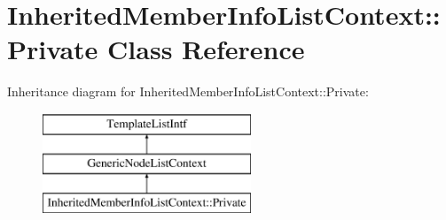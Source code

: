 \hypertarget{class_inherited_member_info_list_context_1_1_private}{}\section{Inherited\+Member\+Info\+List\+Context\+::Private Class Reference}
\label{class_inherited_member_info_list_context_1_1_private}
Inheritance diagram for Inherited\+Member\+Info\+List\+Context\+::Private\+:\begin{figure}[H]
\begin{center}
\leavevmode
\includegraphics[height=3.000000cm]{class_inherited_member_info_list_context_1_1_private}
\end{center}
\end{figure}
